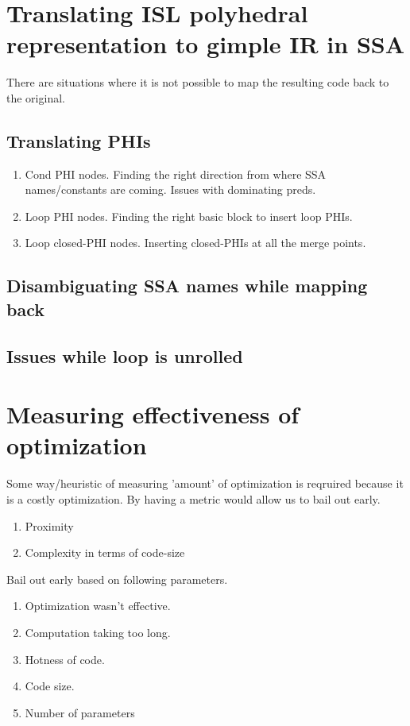 \section{Translating ISL polyhedral representation to gimple IR in SSA}
There are situations where it is not possible to map the resulting code back to the original.
\subsection {Translating PHIs}
\begin{enumerate}
  \item Cond PHI nodes. Finding the right direction from where SSA names/constants are coming. Issues with dominating
    preds.
  \item Loop PHI nodes. Finding the right basic block to insert loop PHIs.
  \item Loop closed-PHI nodes. Inserting closed-PHIs at all the merge points.
\end{enumerate}


\subsection {Disambiguating SSA names while mapping back}
\subsection {Issues while loop is unrolled}

\section{Measuring effectiveness of optimization}
Some way/heuristic of measuring 'amount' of optimization is reqruired because it is a costly optimization.
By having a metric would allow us to bail out early.
\begin{enumerate}
  \item Proximity
  \item Complexity in terms of code-size
\end{enumerate}

Bail out early based on following parameters.
\begin{enumerate}
  \item Optimization wasn't effective.
  \item Computation taking too long.
  \item Hotness of code.
  \item Code size.
  \item Number of parameters
\end{enumerate}

